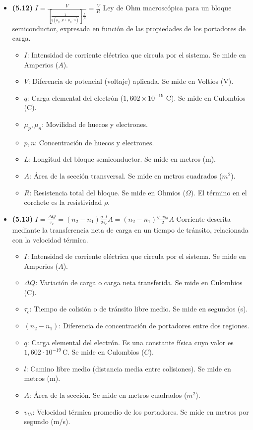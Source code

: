 \documentclass{article}
\begin{document}
\begin{itemize}
				\item \textbf{(5.12)} $\boxed{I = \frac{V}{\left[ \frac{1}{q(\mu_p \cdot p + \mu_n \cdot n)} \right] \frac{L}{A}} = \frac{V}{R}}$ Ley de Ohm macroscópica para un bloque semiconductor, expresada en función de las propiedades de los portadores de carga.
					\begin{itemize}
						\item $I$: Intensidad de corriente eléctrica que circula por el sistema. Se mide en Amperios ($A$).
						\item $V$: Diferencia de potencial (voltaje) aplicada. Se mide en Voltios (V).
						\item $q$: Carga elemental del electrón ($1,602 \times 10^{-19}$ C). Se mide en Culombios (C).
						\item $\mu_p, \mu_n$: Movilidad de huecos y electrones.
						\item $p, n$: Concentración de huecos y electrones.
						\item $L$: Longitud del bloque semiconductor. Se mide en metros (m).
						\item $A$: Área de la sección transversal. Se mide en metros cuadrados ($m^2$).
						\item $R$: Resistencia total del bloque. Se mide en Ohmios ($\Omega$). El término en el corchete es la resistividad $\rho$.
					\end{itemize}

				\item \textbf{(5.13)} $\boxed{I = \frac{\Delta Q}{\tau_c} = (n_2 - n_1) \frac{q \cdot l}{2\tau_c} A = (n_2 - n_1) \frac{q \cdot v_{th}}{2} A}$ Corriente descrita mediante la transferencia neta de carga en un tiempo de tránsito, relacionada con la velocidad térmica.
					\begin{itemize}
						\item $I$: Intensidad de corriente eléctrica que circula por el sistema. Se mide en Amperios ($A$).
						\item $\Delta Q$: Variación de carga o carga neta transferida. Se mide en Culombios (C).
						\item $\tau_c$: Tiempo de colisión o de tránsito libre medio. Se mide en segundos (s).
						\item $(n_2 - n_1)$: Diferencia de concentración de portadores entre dos regiones.
						\item $q$: Carga elemental del electrón. Es una constante física cuyo valor es $1,602\cdot10^{-19}\,\text{C}$. Se mide en Culombios ($C$).
						\item $l$: Camino libre medio (distancia media entre colisiones). Se mide en metros (m).
						\item $A$: Área de la sección. Se mide en metros cuadrados ($m^2$).
						\item $v_{th}$: Velocidad térmica promedio de los portadores. Se mide en metros por segundo (m/s).
					\end{itemize}
			\end{itemize}
\end{document}

